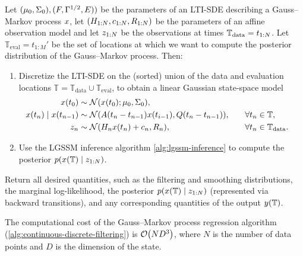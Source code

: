 \documentclass{mimosis}
\begin{document}
\begin{alg}
\algeqspacing
\label{alg:continuous-discrete-filtering}
\label{alg:gaussmarkovregression}
Let
\((\mu_{0}, \Sigma_{0}), (F, \Gamma^{1/2}, E))\)
be the parameters of an LTI-SDE describing a Gauss--Markov process \(x\),
let
\((H_{1:N}, c_{1:N}, R_{1:N})\)
be the parameters of an affine observation model
and let
\(z_{1:N}\)
be the observations at times \(\mathbb{T}_\text{data} = t_{1:N}\).
Let \(\mathbb{T}_\text{eval} = t_{1:M}'\) be the set of locations at which we want to compute the posterior distribution of the Gauss--Markov process.
Then:
\begin{enumerate}
\item Discretize the LTI-SDE on the (sorted) union of the data and evaluation locations
\(\mathbb{T} = \mathbb{T}_\text{data} \cup \mathbb{T}_\text{eval}\),
to obtain a linear Gaussian state-space model
\begin{subequations}
\begin{align}
\st(t_0) &\sim \N( \st(t_0); \mean{0}, \cov{0} ), \\
\st(t_\idxt) \mid \st(t_{\idxt-1}) &\sim \N( \transA(t_\idxt-t_{\idxt-1}) \st(t_{i-1}), \transC(t_\idxt-t_{\idxt-1}) ), \quad && \forall t_\idxt \in \mathbb{T}, \\
\obs_\idxt &\sim \N( \obsA_\idxt \st(t_\idxt) + \obsb_\idxt, \obsC_\idxt ), \quad && \forall t_\idxt \in \mathbb{T}_\text{data}.
\end{align}
\end{subequations}
\item Use the LGSSM inference algorithm \ref{alg:lgssm-inference}
to compute the posterior \(\p(\st(\mathbb{T}) \mid \sobs_{1:N})\).
\end{enumerate}
Return all desired quantities, such as the
filtering and smoothing distributions,
the marginal log-likelihood,
the posterior \(\p(\st(\mathbb{T}) \mid \sobs_{1:N})\) (represented via backward transitions),
and any corresponding quantities of the output \(y(\mathbb{T})\).
\end{alg}

\begin{proposition}
\label{prop:lti-sde-regression-complexity}
The computational cost of the Gauss--Markov process regression algorithm
(\ref{alg:continuous-discrete-filtering})
is \(\order{N D^3}\), where \(N\) is the number of data points and \(D\) is the dimension of the state.
\end{proposition}
\end{document}

